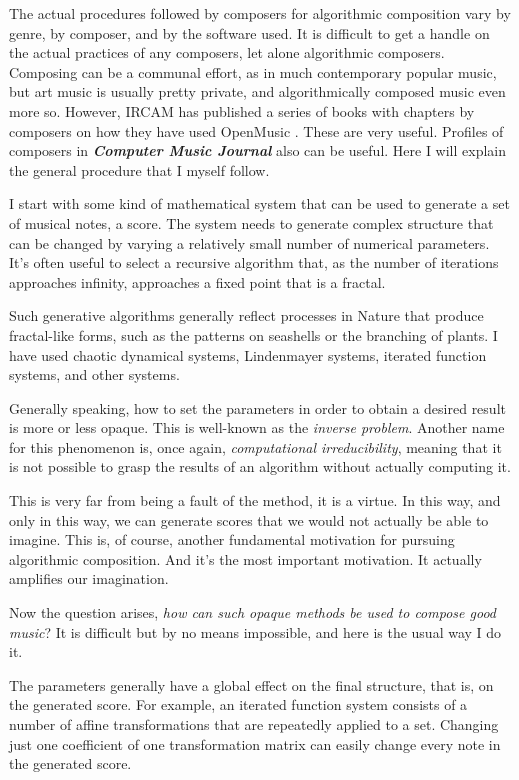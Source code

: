 \documentclass[11pt]{amsart}
\begin{document}
The actual procedures followed by composers for algorithmic composition vary by genre, by composer, and by the software used. It is difficult to get a handle on the actual practices of any composers, let alone algorithmic composers. Composing can be a communal effort, as in much contemporary popular music, but art music is usually pretty private, and algorithmically composed music even more so. However, IRCAM has published a series of books with chapters by composers on how they have used OpenMusic  \cite{omcomposersbook, agon2006om, agon2008om, agon2016om}. These are very useful. Profiles of composers in \emph{\textbf{Computer Music Journal}} also can be useful. Here I will explain the general procedure that I myself follow.

I start with some kind of mathematical system that can be used to generate a set of musical notes, a score. The system needs to generate complex structure that can be changed by varying a relatively small number of numerical parameters. It’s often useful to select a recursive algorithm that, as the number of iterations approaches infinity, approaches a fixed point that is a fractal.

Such generative algorithms generally reflect processes in Nature that produce fractal-like forms, such as the patterns on seashells or the branching of plants. I have used chaotic dynamical systems, Lindenmayer systems, iterated function systems, and other systems.

Generally speaking, how to set the parameters in order to obtain a desired result is more or less opaque. This is well-known as the \emph{inverse problem}. Another name for this phenomenon is, once again, \emph{computational irreducibility}, meaning that it is not possible to grasp the results of an algorithm without actually computing it.

This is very far from being a fault of the method, it is a virtue. In this way, and only in this way, we can generate scores that we would not actually be able to imagine. This is, of course, another fundamental motivation for pursuing algorithmic composition. And it's the most important motivation. It actually amplifies our imagination.

Now the question arises, \emph{how can such opaque methods be used to compose good music}? It is difficult but by no means impossible, and here is the usual way I do it.

The parameters generally have a global effect on the final structure, that is, on the generated score. For example, an iterated function system consists of a number of affine transformations that are repeatedly applied to a set. Changing just one coefficient of one transformation matrix can easily change every note in the generated score.
\end{document}
